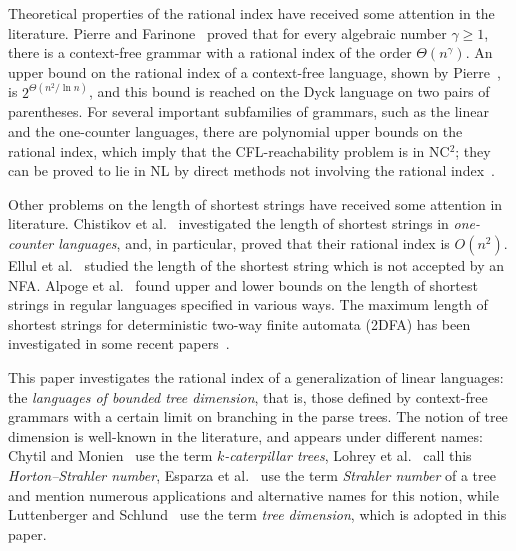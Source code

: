 \documentclass[runningheads]{llncs}
\begin{document}

Theoretical properties of the rational index
have received some attention in the literature.
Pierre and Farinone~\cite{GreibRat} proved that for every algebraic number $\gamma \geqslant 1$,
there is a context-free grammar with a rational index of the order $\Theta(n^\gamma)$.
An upper bound on the rational index of a context-free language,
shown by Pierre~\cite{CFRat}, is $2^{\Theta(n^2/\ln n)}$,
and this bound is reached on the Dyck language on two pairs of parentheses.
For several important subfamilies of grammars,
such as the linear and the one-counter languages,
there are polynomial upper bounds on the rational index,
which imply that the CFL-reachability problem is in NC$^2$;
they can be proved to lie in NL
by direct methods not involving the rational index~\cite{labelledGraphs,LReach}.

Other problems on the length of shortest strings
have received some attention in literature.
Chistikov et al.~\cite{ChistikovCzerwinskiHofmanPilipczukWehar}
investigated the length of shortest strings in \emph{one-counter languages},
and, in particular, proved that their rational index is $O(n^2)$.
Ellul et al.~\cite{EllulKrawetzShallitWang} studied the length of the shortest string 
which is not accepted by an NFA. 
Alpoge et al.~\cite{AlpogeAngSchaefferShallit} 
found upper and lower bounds on the length of shortest strings
in regular languages specified in various ways.
The maximum length of shortest strings
for deterministic two-way finite automata (2DFA) 
has been investigated in some recent papers~\cite{DobronravovDobronravovOkhotin,KrymskiOkhotin,MartynovaOkhotin}.

This paper investigates the rational index
of a generalization of linear languages:
the \emph{languages of bounded tree dimension},
that is, those defined by context-free grammars
with a certain limit on branching in the parse trees.
The notion of tree dimension is well-known in the literature,
and appears under different names:
Chytil and Monien~\cite{ChytilMonien} use the term \emph{$k$-caterpillar trees},
Lohrey et al.~\cite{Lohrey22} call this \emph{Horton--Strahler number}, 
Esparza et al.~\cite{EsparzaLuttenbergerSchlund} use the term \emph{Strahler number} of a tree
and mention numerous applications and alternative names for this notion,
while Luttenberger and Schlund~\cite{LuttenbergerSchlund} use the term \emph{tree dimension},
which is adopted in this paper.
\end{document}
